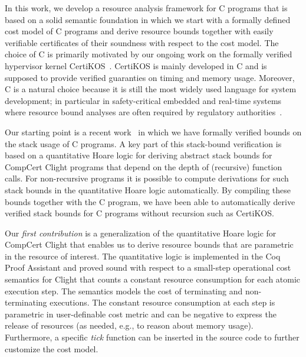 \documentclass[nocopyrightspace,preprint]{sigplanconf}
\begin{document}
%
In this work, we develop a resource analysis framework for C programs
that is based on a solid semantic foundation in which we start with a
formally defined cost model of C programs and derive resource bounds
together with easily verifiable certificates of their soundness with
respect to the cost model. The choice of C is primarily motivated by
our ongoing work on the formally verified hypervisor kernel
CertiKOS~\cite{GuVFSC11}.  CertiKOS is mainly developed in C and is
supposed to provide verified guaranties on timing and memory usage.
Moreover, C is a natural choice because it is still the most widely
used language for system development; in particular in safety-critical
embedded and real-time systems where resource bound analyses are often
required by regulatory authorities~\cite{May2013}.

Our starting point is a recent work~\cite{veristack14} in which we
have formally verified bounds on the stack usage of C programs.  A key
part of this stack-bound verification is based on a quantitative Hoare
logic for deriving abstract stack bounds for CompCert Clight programs
that depend on the depth of (recursive) function calls.  For
non-recursive programs it is possible to compute derivations for such
stack bounds in the quantitative Hoare logic automatically.  By
compiling these bounds together with the C program, we have been able
to automatically derive verified stack bounds for C programs without
recursion such as CertiKOS.

Our \emph{first contribution} is a generalization of the quantitative
Hoare logic for CompCert Clight that enables us to derive resource
bounds that are parametric in the resource of interest.  The
quantitative logic is implemented in the Coq Proof Assistant and
proved sound with respect to a small-step operational cost semantics
for Clight that counts a constant resource consumption for each atomic
execution step.  The semantics models the cost of terminating and
non-terminating executions.  The constant resource consumption at each
step is parametric in user-definable cost metric and can be negative
to express the release of resources (as needed, e.g., to reason about
memory usage).  Furthermore, a specific \emph{tick} function can be
inserted in the source code to further customize the cost model.
\end{document}
